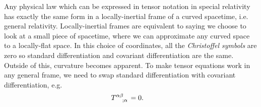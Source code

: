 \documentclass[a4paper, 11pt, normalem]{report}
\begin{document}
Any physical law which can be expressed in tensor notation in special relativity has exactly the same form in a locally-inertial frame of a curved spacetime, i.e. general relativity. 
Locally-inertial frames are equivalent to saying we choose to look at a small piece of spacetime, where we can approximate any curved space to a locally-flat space. 
In this choice of coordinates, all the \emph{Christoffel symbols} are zero so standard differentiation and covariant differentiation are the same. 
Outside of this, curvature becomes apparent. 
To make tensor equations work in any general frame, we need to swap standard differentiation with covariant differentiation, e.g.
\begin{align}
    \tensor{T}{^{\alpha\beta}_{;\alpha}} &= 0.
\end{align}
\end{document}
